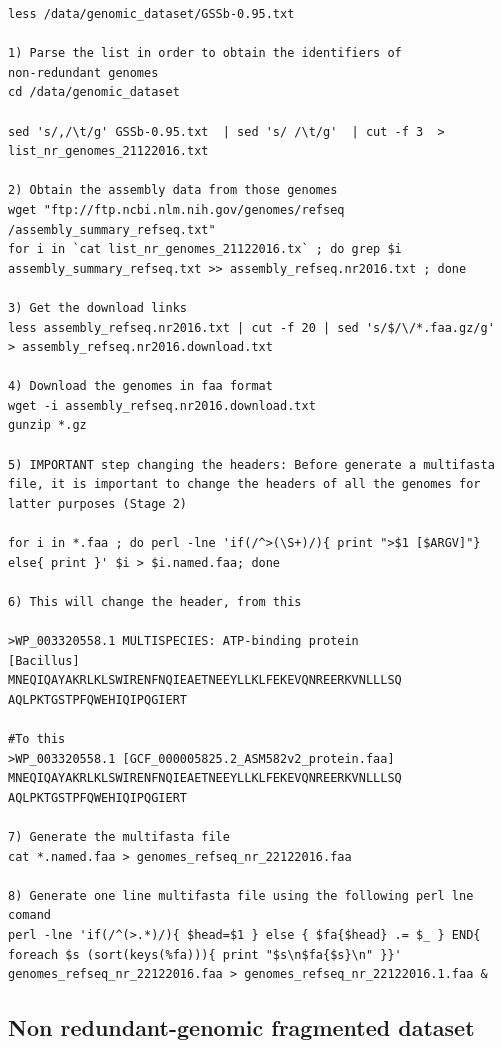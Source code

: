 \documentclass[a4paper,11pt]{report}
\begin{document}
\begin{verbatim}
less /data/genomic_dataset/GSSb-0.95.txt

1) Parse the list in order to obtain the identifiers of 
non-redundant genomes
cd /data/genomic_dataset

sed 's/,/\t/g' GSSb-0.95.txt  | sed 's/ /\t/g'  | cut -f 3  > 
list_nr_genomes_21122016.txt

2) Obtain the assembly data from those genomes 
wget "ftp://ftp.ncbi.nlm.nih.gov/genomes/refseq
/assembly_summary_refseq.txt" 
for i in `cat list_nr_genomes_21122016.tx` ; do grep $i 
assembly_summary_refseq.txt >> assembly_refseq.nr2016.txt ; done

3) Get the download links 
less assembly_refseq.nr2016.txt | cut -f 20 | sed 's/$/\/*.faa.gz/g' 
> assembly_refseq.nr2016.download.txt

4) Download the genomes in faa format  
wget -i assembly_refseq.nr2016.download.txt
gunzip *.gz 

5) IMPORTANT step changing the headers: Before generate a multifasta 
file, it is important to change the headers of all the genomes for 
latter purposes (Stage 2) 

for i in *.faa ; do perl -lne 'if(/^>(\S+)/){ print ">$1 [$ARGV]"} 
else{ print }' $i > $i.named.faa; done

6) This will change the header, from this  

>WP_003320558.1 MULTISPECIES: ATP-binding protein 
[Bacillus]
MNEQIQAYAKRLKLSWIRENFNQIEAETNEEYLLKLFEKEVQNREERKVNLLLSQ
AQLPKTGSTPFQWEHIQIPQGIERT

#To this 
>WP_003320558.1 [GCF_000005825.2_ASM582v2_protein.faa]
MNEQIQAYAKRLKLSWIRENFNQIEAETNEEYLLKLFEKEVQNREERKVNLLLSQ
AQLPKTGSTPFQWEHIQIPQGIERT

7) Generate the multifasta file 
cat *.named.faa > genomes_refseq_nr_22122016.faa

8) Generate one line multifasta file using the following perl lne comand
perl -lne 'if(/^(>.*)/){ $head=$1 } else { $fa{$head} .= $_ } END{ 
foreach $s (sort(keys(%fa))){ print "$s\n$fa{$s}\n" }}' 
genomes_refseq_nr_22122016.faa > genomes_refseq_nr_22122016.1.faa & 

\end{verbatim}


\subsection{Non redundant-genomic fragmented dataset}
\end{document}
